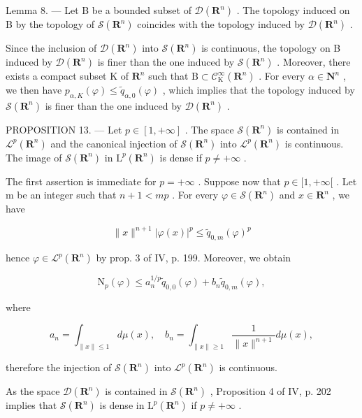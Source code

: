 Lemma 8. --- Let B be a bounded subset of \(\mathcal{D}(\mathbf{R}^{n})\) . The topology induced on B by the topology of \(\mathcal{S}(\mathbf{R}^{n})\) coincides with the topology induced by \(\mathcal{D}(\mathbf{R}^{n})\) .

Since the inclusion of \(\mathcal{D}(\mathbf{R}^{n})\) into \(\mathcal{S}(\mathbf{R}^{n})\) is continuous, the topology on B induced by \(\mathcal{D}(\mathbf{R}^{n})\) is finer than the one induced by \(\mathcal{S}(\mathbf{R}^{n})\) . Moreover, there exists a compact subset K of \(\mathbf{R}^{n}\) such that \(\mathrm{B} \subset \mathcal{C}_{\mathrm{K}}^{\infty}(\mathbf{R}^{n})\) . For every \(\alpha \in \mathbf{N}^{n}\) , we then have \(p_{\alpha,K}(\varphi) \leqslant \widetilde{q}_{\alpha,0}(\varphi)\) , which implies that the topology induced by \(\mathcal{S}(\mathbf{R}^{n})\) is finer than the one induced by \(\mathcal{D}(\mathbf{R}^{n})\) .

PROPOSITION 13. --- Let \(p \in [1, +\infty]\) . The space \(\mathcal{S}(\mathbf{R}^{n})\) is contained in \(\mathcal{L}^{p}(\mathbf{R}^{n})\) and the canonical injection of \(\mathcal{S}(\mathbf{R}^{n})\) into \(\mathcal{L}^{p}(\mathbf{R}^{n})\) is continuous. The image of \(\mathcal{S}(\mathbf{R}^{n})\) in \(\mathrm{L}^{p}(\mathbf{R}^{n})\) is dense if \(p \neq +\infty\) .

The first assertion is immediate for \(p = +\infty\) . Suppose now that \(p \in [1, +\infty[\) . Let m be an integer such that \(n + 1 < mp\) . For every \(\varphi \in \mathcal{S}(\mathbf{R}^{n})\) and \(x \in \mathbf{R}^{n}\) , we have

\[
\| x \| ^ {n + 1} | \varphi (x) | ^ {p} \leqslant \widetilde {q} _ {0, m} (\varphi) ^ {p}
\]

hence \(\varphi \in \mathcal{L}^p (\mathbf{R}^n)\) by prop. 3 of IV, p. 199. Moreover, we obtain

\[
\mathrm{N} _ {p} (\varphi) \leqslant a _ {n} ^ {1 / p} \widetilde {q} _ {0, 0} (\varphi) + b _ {n} \widetilde {q} _ {0, m} (\varphi),
\]

where

\[
a _ {n} = \int_ {\| x \| \leqslant 1} d \mu (x), \quad b _ {n} = \int_ {\| x \| \geqslant 1} \frac {1}{\| x \| ^ {n + 1}} d \mu (x),
\]

therefore the injection of \(\mathcal{S}(\mathbf{R}^n)\) into \(\mathcal{L}^p (\mathbf{R}^n)\) is continuous.

As the space \(\mathcal{D}(\mathbf{R}^n)\) is contained in \(\mathcal{S}(\mathbf{R}^n)\) , Proposition 4 of IV, p. 202 implies that \(\mathcal{S}(\mathbf{R}^n)\) is dense in \(\mathrm{L}^p (\mathbf{R}^n)\) if \(p\neq +\infty\) .

